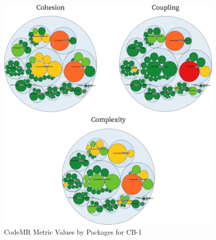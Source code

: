 \begin{figure}[ht!]
    \centering
    \includegraphics[scale=1.1]{figures/CB-1-package.png}
    \caption{CodeMR Metric Values by Packages for CB-1}
    \label{fig:CB-1-package}
\end{figure}
\FloatBarrier


